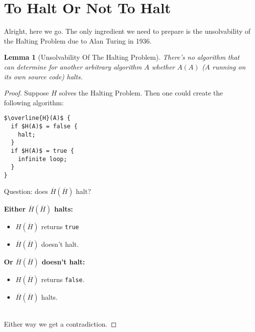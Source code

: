 \documentclass{article}
\theoremstyle{theorem}
\newtheorem{lemma}{Lemma}
\newcommand{\nameditem}[1]{\item\textbf{#1}}
\newcommand{\impl}{\item[$\Rightarrow$]}
\begin{document}
\section{To Halt Or Not To Halt}

Alright, here we go. The only ingredient we need to prepare is the unsolvability of the Halting Problem due to Alan Turing in 1936.

\begin{lemma}[Unsolvability Of The Halting Problem]
There's no algorithm that can determine for another arbitrary algorithm $A$ whether $A(A)$ ($A$ running on its own source code) halts.
\end{lemma}

\begin{proof}
Suppose $H$ solves the Halting Problem. Then one could create the following algorithm:\\[0.5em]
\begin{minipage}{\linewidth}
\begin{lstlisting}
$\overline{H}(A)$ {
  if $H(A)$ = false {
    halt;
  }
  if $H(A)$ = true {
    infinite loop;
  }
}
\end{lstlisting}
\end{minipage}
Question: does $\overline{H}(\overline{H})$ halt?\\[0.5em]
\begin{minipage}{0.5\textwidth}
\begin{description}[noitemsep]
\nameditem{Either $\overline{H}(\overline{H})$ halts:} 
\begin{itemize}[noitemsep]
\impl $H(\overline{H})$ returns \lstinline{true}
\impl $\overline{H}(\overline{H})$ doesn't halt. \lightning
\end{itemize}
\end{description}
\end{minipage}
\begin{minipage}{0.5\textwidth}
\begin{description}[noitemsep]
\nameditem{Or $\overline{H}(\overline{H})$ doesn't halt:} 
\begin{itemize}[noitemsep]
\impl $H(\overline{H})$ returns \lstinline{false}.
\impl $\overline{H}(\overline{H})$ halts. \lightning
\end{itemize}
\end{description}
\end{minipage}\\[1em]
Either way we get a contradiction.
\end{proof}
\end{document}
